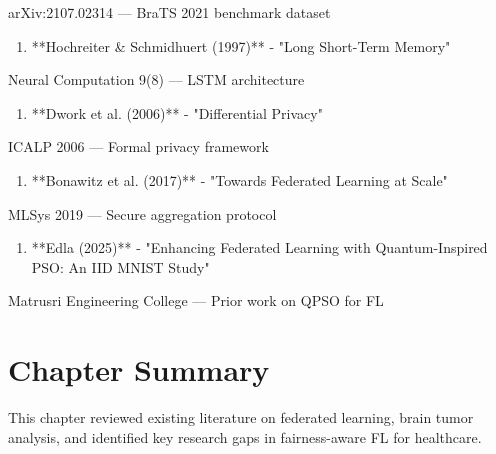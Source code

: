 arXiv:2107.02314 — BraTS 2021 benchmark dataset

\begin{enumerate}
  \item **Hochreiter \& Schmidhuert (1997)** - "Long Short-Term Memory"
\end{enumerate}

Neural Computation 9(8) — LSTM architecture

\begin{enumerate}
  \item **Dwork et al. (2006)** - "Differential Privacy"
\end{enumerate}

ICALP 2006 — Formal privacy framework

\begin{enumerate}
  \item **Bonawitz et al. (2017)** - "Towards Federated Learning at Scale"
\end{enumerate}

MLSys 2019 — Secure aggregation protocol

\begin{enumerate}
  \item **Edla (2025)** - "Enhancing Federated Learning with Quantum-Inspired PSO: An IID MNIST Study"
\end{enumerate}

Matrusri Engineering College — Prior work on QPSO for FL


\section{Chapter Summary}
This chapter reviewed existing literature on federated learning, brain tumor analysis, and identified key research gaps in fairness-aware FL for healthcare.
